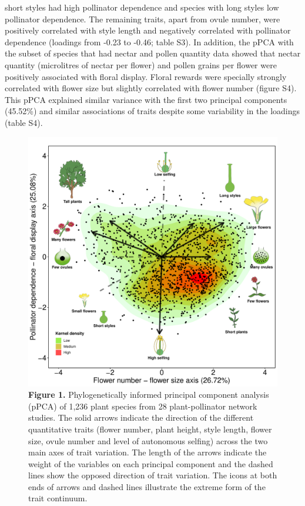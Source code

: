 \documentclass[
  12pt,
  a4paper,
]{article}
\begin{document}
short styles had high pollinator dependence and species with long styles low pollinator dependence. The remaining traits, apart from ovule number, were positively correlated with style length and negatively correlated with pollinator dependence (loadings from -0.23 to -0.46; table S3). In addition, the pPCA with the subset of species that had nectar and pollen quantity data showed that nectar quantity (microlitres of nectar per flower) and pollen grains per flower were positively associated with floral display. Floral rewards were specially strongly correlated with flower size but slightly correlated with flower number (figure S4). This pPCA explained similar variance with the first two principal components (45.52\%) and similar associations of traits despite some variability in the loadings (table S4).

\begin{figure}[H]

{\centering \includegraphics[width=0.85\linewidth]{output/figures/unnamed-chunk-2-1} 

}

\caption{\textbf{Figure 1.} Phylogenetically informed principal component analysis (pPCA) of 1,236 plant species from 28 plant-pollinator network studies. The solid arrows indicate the direction of the different quantitative traits (flower number, plant height, style length, flower size, ovule number and level of autonomous selfing) across the two main axes of trait variation. The length of the arrows indicate the weight of the variables on each principal component and the dashed lines show the opposed direction of trait variation. The icons at both ends of arrows and dashed lines illustrate the extreme form of the trait continuum.}\label{fig:unnamed-chunk-2}
\end{figure}
\end{document}
